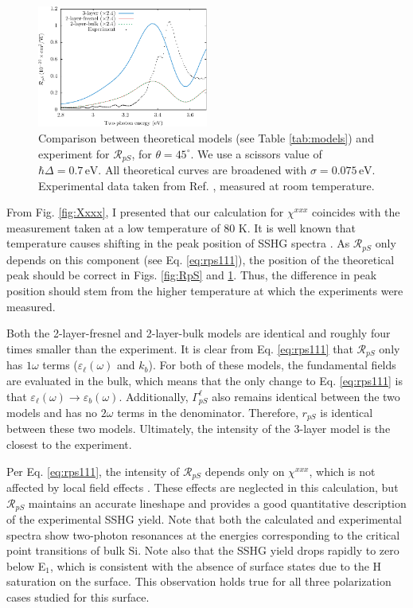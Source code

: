 \begin{figure}[H]
\centering
\includegraphics[width=0.5\textwidth]{content/figures/fig-4_4_02}
\caption{Comparison between theoretical models (see Table
\ref{tab:models}) and experiment for $\mathcal{R}_{pS}$, for $\theta=45^\circ$.
We use a scissors value of $\hbar\Delta = 0.7\,\text{eV}$. All theoretical
curves are broadened with $\sigma=0.075\,\text{eV}$. Experimental data taken
from Ref. \cite{mitchellSS01}, measured at room temperature.}
\label{fig:mitchellRpS}
\end{figure}

From Fig. \ref{fig:Xxxx}, I presented that our calculation for
$\chi^{xxx}$ coincides with the measurement taken at a
low temperature of 80 K. It is well known that temperature causes shifting in
the peak position of SSHG spectra \cite{dadapPRB97}. As $\mathcal{R}_{pS}$ only
depends on this component (see Eq. \eqref{eq:rps111}), the position of the
theoretical peak should be correct in Figs. \ref{fig:RpS} and
\ref{fig:mitchellRpS}. Thus, the difference in peak position should stem from
the higher temperature at which the experiments were measured.

Both the 2-layer-fresnel and 2-layer-bulk models are identical and roughly four
times smaller than the experiment. It is clear from Eq. \eqref{eq:rps111} that
$\mathcal{R}_{pS}$ only has $1\omega$ terms ($\varepsilon_{\ell}(\omega)$ and
$k_{b}$). For both of these models, the fundamental fields are evaluated in the
bulk, which means that the only change to Eq. \eqref{eq:rps111} is that
$\varepsilon_{\ell}(\omega) \rightarrow \varepsilon_{b}(\omega)$. Additionally,
$\Gamma^{\ell}_{pS}$ also remains identical between the two models and has no
$2\omega$ terms in the denominator. Therefore, $r_{pS}$ is identical between
these two models. Ultimately, the intensity of the 3-layer model is the closest
to the experiment.

Per Eq. \eqref{eq:rps111}, the intensity of $\mathcal{R}_{pS}$ depends only on
$\chi^{xxx}$, which is not affected by local field effects
\cite{tancognedejean:tel-01235611}. These effects are neglected in this
calculation, but $\mathcal{R}_{pS}$ maintains an accurate lineshape and provides
a good quantitative description of the experimental SSHG yield. Note that both
the calculated and experimental spectra show two-photon resonances at the
energies corresponding to the critical point transitions of bulk Si. Note also
that the SSHG yield drops rapidly to zero below E$_{1}$, which is consistent
with the absence of surface states due to the H saturation on the surface. This
observation holds true for all three polarization cases studied for this
surface.


